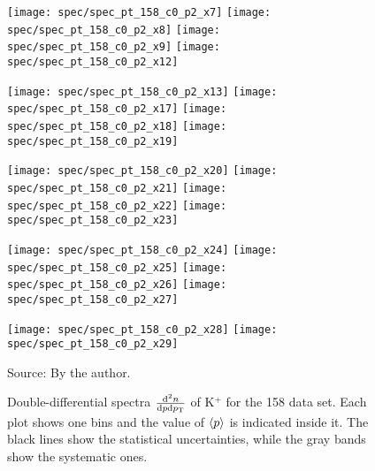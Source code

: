 \begin{figure}[!ht]
  \centering

  \texttt{[image: spec/spec\_pt\_158\_c0\_p2\_x7]}
  \texttt{[image: spec/spec\_pt\_158\_c0\_p2\_x8]}
  \texttt{[image: spec/spec\_pt\_158\_c0\_p2\_x9]}
  \texttt{[image: spec/spec\_pt\_158\_c0\_p2\_x12]}

  \texttt{[image: spec/spec\_pt\_158\_c0\_p2\_x13]}
  \texttt{[image: spec/spec\_pt\_158\_c0\_p2\_x17]}
  \texttt{[image: spec/spec\_pt\_158\_c0\_p2\_x18]}
  \texttt{[image: spec/spec\_pt\_158\_c0\_p2\_x19]}

  \texttt{[image: spec/spec\_pt\_158\_c0\_p2\_x20]}
  \texttt{[image: spec/spec\_pt\_158\_c0\_p2\_x21]}
  \texttt{[image: spec/spec\_pt\_158\_c0\_p2\_x22]}
  \texttt{[image: spec/spec\_pt\_158\_c0\_p2\_x23]}

  \texttt{[image: spec/spec\_pt\_158\_c0\_p2\_x24]}
  \texttt{[image: spec/spec\_pt\_158\_c0\_p2\_x25]}
  \texttt{[image: spec/spec\_pt\_158\_c0\_p2\_x26]}
  \texttt{[image: spec/spec\_pt\_158\_c0\_p2\_x27]}

  \texttt{[image: spec/spec\_pt\_158\_c0\_p2\_x28]}
  \texttt{[image: spec/spec\_pt\_158\_c0\_p2\_x29]}

  \caption{Double-differential spectra $\frac{\text{d}^2n}{\text{d}p\text{d}p_\text{T}}$
    of K$^+$ for the 158 \GeVc data set. Each plot shows one \pp bins and the value
    of $\langle p\rangle$ is indicated inside it. The black lines show the statistical
    uncertainties, while the gray bands show the systematic ones.}
  \label{fig:hadron:spec:dedx:all158:c0p2}
  \begin{center}
    \small Source: By the author. 
  \end{center}
\end{figure}


